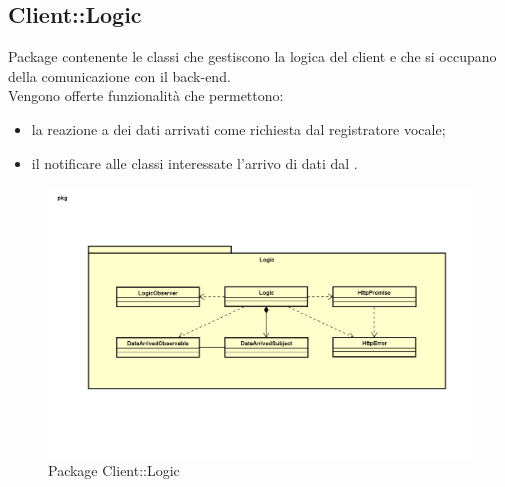 \subsection{Client::Logic}
Package contenente le classi che gestiscono la logica del client e che si occupano della comunicazione con il back-end.\\ Vengono offerte funzionalità che permettono: \begin{itemize} \item la reazione a dei dati arrivati come richiesta dal registratore vocale; \item il notificare alle classi interessate l'arrivo di dati dal . \end{itemize}
\begin{figure}[h] \centering \includegraphics[width=\textwidth,height=\textheight,keepaspectratio]{images/diagrams/client/Client/Logic.png}
\caption{Package Client::Logic}
\end{figure}
\newpage


